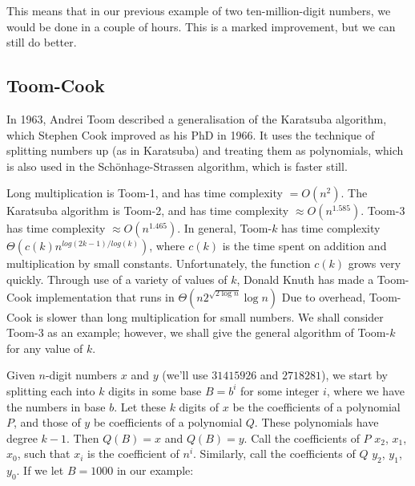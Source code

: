 \documentclass[12pt,a4paper]{report}
\begin{document}
\begin{multicols}{2}
\begin{multicols}{2}
This means that in our previous example of two ten-million-digit numbers, we would be done in a couple of hours. This is a marked improvement, but we can still do better.

\subsection{Toom-Cook}
In 1963, Andrei Toom described a generalisation of the Karatsuba algorithm, which Stephen Cook improved as his PhD in 1966. It uses the technique of splitting numbers up (as in Karatsuba) and treating them as polynomials, which is also used in the Sch\"onhage-Strassen algorithm, which is faster still.

Long multiplication is Toom-1, and has time complexity \(=O(n^2)\). The Karatsuba algorithm is Toom-2, and has time complexity \(\approx{}O(n^1.585)\). Toom-3 has time complexity \(\approx{}O(n^1.465)\). In general, Toom-\(k\) has time complexity \(\Theta(c(k)n^{log(2k-1)/log(k)})\), where \(c(k)\) is the time spent on addition and multiplication by small constants. Unfortunately, the function \(c(k)\) grows very quickly. Through use of a variety of values of \(k\), Donald Knuth has made a Toom-Cook implementation that runs in \(\Theta(n2^{\sqrt{2\log{}n}}\log{}n)\) Due to overhead, Toom-Cook is slower than long multiplication for small numbers. We shall consider Toom-3 as an example; however, we shall give the general algorithm of Toom-\(k\) for any value of \(k\).

Given \(n\)-digit numbers \(x\) and \(y\) (we'll use \(31415926\) and \(2718281\)), we start by splitting each into \(k\) digits in some base \(B=b^i\) for some integer \(i\), where we have the numbers in base \(b\).
Let these \(k\) digits of \(x\) be the coefficients of a polynomial \(P\), and those of \(y\) be coefficients of a polynomial \(Q\). These polynomials have degree \(k-1\). Then \(Q(B)=x\) and \(Q(B)=y\). Call the coefficients of \(P\) \(x_2\), \(x_1\), \(x_0\), such that \(x_i\) is the coefficient of \(n^i\). Similarly, call the coefficients of \(Q\) \(y_2\), \(y_1\), \(y_0\). If we let \(B=1000\) in our example:




\end{multicols}
\end{multicols}
\end{document}

